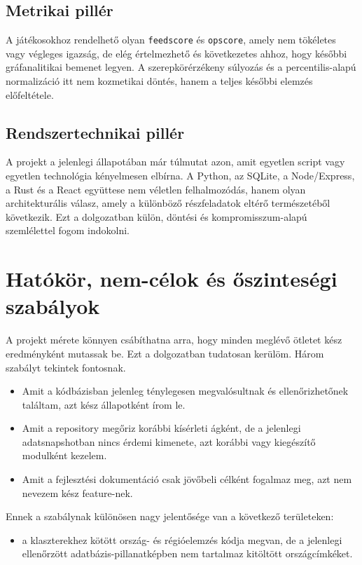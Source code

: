 ﻿\documentclass[a4paper,12pt]{report}
\begin{document}
\subsection{Metrikai pillér}

A játékosokhoz rendelhető olyan \texttt{feedscore} és \texttt{opscore}, amely nem tökéletes vagy végleges igazság, de elég értelmezhető és következetes ahhoz, hogy későbbi gráfanalitikai bemenet legyen. A szerepkörérzékeny súlyozás és a percentilis-alapú normalizáció itt nem kozmetikai döntés, hanem a teljes későbbi elemzés előfeltétele.

\subsection{Rendszertechnikai pillér}

A projekt a jelenlegi állapotában már túlmutat azon, amit egyetlen script vagy egyetlen technológia kényelmesen elbírna. A Python, az SQLite, a Node/Express, a Rust és a React együttese nem véletlen felhalmozódás, hanem olyan architekturális válasz, amely a különböző részfeladatok eltérő természetéből következik. Ezt a dolgozatban külön, döntési és kompromisszum-alapú szemlélettel fogom indokolni.

\section{Hatókör, nem-célok és őszinteségi szabályok}

A projekt mérete könnyen csábíthatna arra, hogy minden meglévő ötletet kész eredményként mutassak be. Ezt a dolgozatban tudatosan kerülöm. Három szabályt tekintek fontosnak.

\begin{itemize}
    \item Amit a kódbázisban jelenleg ténylegesen megvalósultnak és ellenőrizhetőnek találtam, azt kész állapotként írom le.
    \item Amit a repository megőriz korábbi kísérleti ágként, de a jelenlegi adatsnapshotban nincs érdemi kimenete, azt korábbi vagy kiegészítő modulként kezelem.
    \item Amit a fejlesztési dokumentáció csak jövőbeli célként fogalmaz meg, azt nem nevezem kész feature-nek.
\end{itemize}

Ennek a szabálynak különösen nagy jelentősége van a következő területeken:

\begin{itemize}
    \item a klaszterekhez kötött ország- és régióelemzés kódja megvan, de a jelenlegi ellenőrzött adatbázis-pillanatképben nem tartalmaz kitöltött országcímkéket.
\end{itemize}
\end{document}
